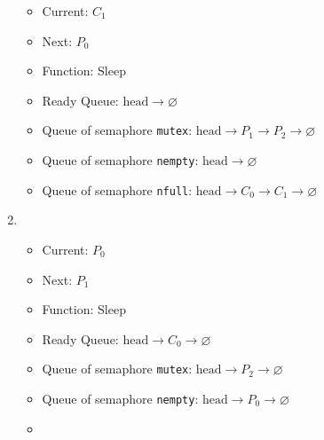 \documentclass[11pt]{article}
\begin{document}
\begin{question}
\begin{enumerate}
{\begin{itemize}
                        \item{Current: $C_{1}$}
                        \item{Next: $P_{0}$}
                        \item{Function: Sleep}
                        \item{
                            Ready Queue: $\text{head}\longrightarrow
                            \varnothing$
                        } \item{
                            Queue of semaphore {\tt mutex}: $\text{head}\longrightarrow
                            P_{1}\longrightarrow
                            P_{2}\longrightarrow
                            \varnothing$
                        }
                        \item{
                            Queue of semaphore {\tt nempty}: $\text{head}\longrightarrow\varnothing$
                        }
                        \item{
                            Queue of semaphore {\tt nfull}: $\text{head}\longrightarrow
                            C_{0}\longrightarrow
                            C_{1}\longrightarrow
                            \varnothing$
                        }
                \end{itemize}
                }
                \item {
                    \begin{itemize}
                        \item{Current: $P_{0}$}
                        \item{Next: $P_{1}$}
                        \item{Function: Sleep}
                        \item{
                            Ready Queue: $\text{head}\longrightarrow
                            C_{0}\longrightarrow
                            \varnothing$
                        } \item{
                            Queue of semaphore {\tt mutex}: $\text{head}\longrightarrow
                            P_{2}\longrightarrow
                            \varnothing$
                        }
                        \item{
                            Queue of semaphore {\tt nempty}: $\text{head}\longrightarrow
                            P_{0}\longrightarrow
                            \varnothing$
                        }
                        \item{
}
\end{itemize}}
\end{enumerate}
\end{question}
\end{document}
